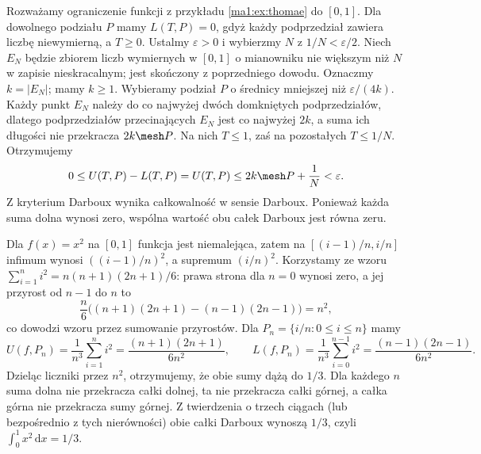 \begin{przyklad}
Rozważamy ograniczenie funkcji z przykładu \ref{ma1:ex:thomae} do $[0,1]$.
Dla dowolnego podziału $P$ mamy $L(T,P)=0$, gdyż każdy podprzedział zawiera liczbę niewymierną, a $T\ge0$. Ustalmy $\varepsilon>0$ i wybierzmy $N$ z $1/N<\varepsilon/2$. Niech $E_N$ będzie zbiorem liczb wymiernych w $[0,1]$ o mianowniku nie większym niż $N$ w zapisie nieskracalnym; jest skończony z poprzedniego dowodu. Oznaczmy $k=|E_N|$; mamy $k\ge1$. Wybieramy podział $P$ o średnicy mniejszej niż $\varepsilon/(4k)$. Każdy punkt $E_N$ należy do co najwyżej dwóch domkniętych podprzedziałów, dlatego podprzedziałów przecinających $E_N$ jest co najwyżej $2k$, a suma ich długości nie przekracza $2k\mesh P$. Na nich $T\le1$, zaś na pozostałych $T\le1/N$. Otrzymujemy
\[
0\le U(T,P)-L(T,P)=U(T,P)
\le 2k\mesh P+\frac1N<\varepsilon.
\]
Z kryterium Darboux wynika całkowalność w sensie Darboux. Ponieważ każda suma dolna wynosi zero, wspólna wartość obu całek Darboux jest równa zeru.
\end{przyklad}
\begin{przyklad}
Dla $f(x)=x^2$ na $[0,1]$ funkcja jest niemalejąca, zatem na $[(i-1)/n,i/n]$ infimum wynosi $((i-1)/n)^2$, a supremum $(i/n)^2$. Korzystamy ze wzoru $\sum_{i=1}^n i^2=n(n+1)(2n+1)/6$: prawa strona dla $n=0$ wynosi zero, a jej przyrost od $n-1$ do $n$ to
\[
\frac{n}{6}\bigl((n+1)(2n+1)-(n-1)(2n-1)\bigr)=n^2,
\]
co dowodzi wzoru przez sumowanie przyrostów. Dla $P_n=\{i/n:0\le i\le n\}$ mamy
\[
U(f,P_n)=\frac1{n^3}\sum_{i=1}^n i^2=\frac{(n+1)(2n+1)}{6n^2},\qquad
L(f,P_n)=\frac1{n^3}\sum_{i=0}^{n-1}i^2=\frac{(n-1)(2n-1)}{6n^2}.
\]
Dzieląc liczniki przez $n^2$, otrzymujemy, że obie sumy dążą do $1/3$. Dla każdego $n$ suma dolna nie przekracza całki dolnej, ta nie przekracza całki górnej, a całka górna nie przekracza sumy górnej. Z twierdzenia o trzech ciągach (lub bezpośrednio z tych nierówności) obie całki Darboux wynoszą $1/3$, czyli $\int_0^1x^2\,\mathrm dx=1/3$.
\end{przyklad}
